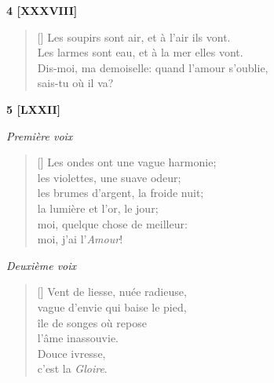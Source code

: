 \documentclass[a4paper,12pt]{book}
\begin{document}
\bigskip

\begin{center}
  \textbf{4 [XXXVIII]}
\end{center}

\settowidth{\versewidth}{Les larmes sont eau, et à la mer elles vont.}

\begin{verse}[\versewidth]
  Les soupirs sont air, et à l'air ils vont. \\
  Les larmes sont eau, et à la mer elles vont. \\
  Dis-moi, ma demoiselle: quand l'amour s'oublie, \\
  sais-tu où il va?
\end{verse}

\bigskip

\begin{center}
  \textbf{5 [LXXII]}
\end{center}


\begin{center} \emph{Première voix} \end{center}

\begin{verse}[\versewidth]
  Les ondes ont une vague harmonie; \\
  les violettes, une suave odeur; \\
  les brumes d'argent, la froide nuit; \\
  la lumière et l'or, le jour; \\
  moi, quelque chose de meilleur: \\
  moi, j'ai l'\emph{Amour}!
\end{verse}

\smallskip

\begin{center} \emph{Deuxième voix} \end{center}

\begin{verse}[\versewidth]
  Vent de liesse, nuée radieuse, \\
  vague d'envie qui baise le pied, \\
  île de songes où repose \\
  l'âme inassouvie. \\
  Douce ivresse, \\
  c'est la \emph{Gloire}.
\end{verse}
\end{document}
